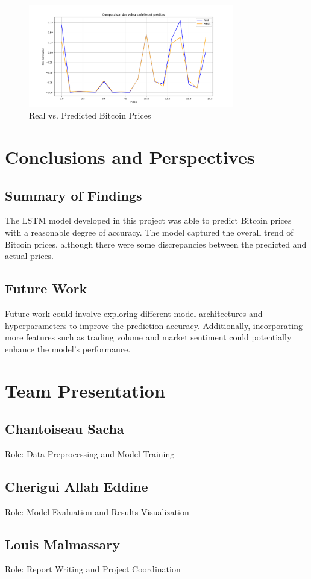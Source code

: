 \documentclass{article}
\begin{document}
\begin{figure}[h]
    \centering
    \includegraphics[width=0.8\textwidth]{img/Prediction.png}
    \caption{Real vs. Predicted Bitcoin Prices}
    \label{fig:predictions}
\end{figure}

\section{Conclusions and Perspectives}
\subsection{Summary of Findings}
The LSTM model developed in this project was able to predict Bitcoin prices with a reasonable degree of accuracy. The model captured the overall trend of Bitcoin prices, although there were some discrepancies between the predicted and actual prices.

\subsection{Future Work}
Future work could involve exploring different model architectures and hyperparameters to improve the prediction accuracy. Additionally, incorporating more features such as trading volume and market sentiment could potentially enhance the model's performance.

\section{Team Presentation}
\subsection{Chantoiseau Sacha}
Role: Data Preprocessing and Model Training

\subsection{Cherigui Allah Eddine}
Role: Model Evaluation and Results Visualization

\subsection{Louis Malmassary}
Role: Report Writing and Project Coordination
\end{document}
